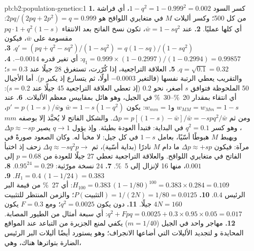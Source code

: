 \begin{solution}{pb:b2:population-genetics:1}
\textbf{1.} كسر السود $1 - q^{2} = 1 - 0.999^{2} = 0.002$،
أي فراشة من كل 500؛ وكسر أليلات $M$ في متغايري اللواقح هو
$2pq/(2pq + 2p^{2}) = q = 0.999$: أي كلها عمليًا.
\textbf{2.} عند $\bar w = 1 - sq^{2}$، تكون نسخ  الفاتح
بعد الانتقاء $pq\cdot 1 + q^{2}(1 - s)$ مقسومة على $\bar w$، فيكون $q'
= (pq + q^{2} - sq^{2})/(1 - sq^{2}) = q(1 - sq)/(1 - sq^{2})$.
\textbf{3.} $q_1 = 0.999\times(1 - 0.2997)/(1 - 0.2994) = 0.99857$:
أي تغير قدره $-0.0014$.
\textbf{4.} $q = \sqrt{0.1} = 0.32$.
\textbf{5.} العلاقة التراجعية، إذا كُرّرت، تستغرق 28 جيلًا عند $s =
0.3$؛ والتقريب يعطي الرتبة نفسها (فالتغير
$-0.0003$ أولًا، ثم يتسارع إذ يكبر $p$). أما الأجيال 50
الملحوظة فتوافق $s$ أصغر، نحو $0.2$ (إذ تعطي العلاقة
التراجعية 45 جيلًا عند $s = 0.2$): أي انتقاء بمقدار \qtyrange{20}{30}{\%}
في الجيل، وهو هائل بمقاييس معظم الأليلات.
\textbf{6.} عند $w_{MM} = w_{Mm} = 1 - s$ و$w_{mm} = 1$: يكون $\bar w = 1
- s(1 - q^{2})$ و$p' = p(1 - s)/\bar w$، ومن ثم $\Delta p = p[(1 - s) -
\bar w]/\bar w = -spq^{2}/\bar w$. والشكل الفاتح لا يُحبَّذ إلا بوصفه
 $mm$، وهو كسر $q^{2} = 0.1$ في البداية: فتبدأ
العودة بطيئة. وإذ يؤول $q \to 1$ يصير $\Delta p \approx -sp$ ويهبط $M$
هبوطًا أسّيًا، بعامل $1 - s$ في كل جيل: 
 لا مخبأ له. وكان الصعود صورةً في مرآة:
فيكون $\Delta p \approx +sp$ ما دام $M$ نادرًا (بداية أسّية)، ثم
$\Delta q \approx -sq^{2}p \to$ زحف إذ اختبأ  الفاتح في
متغايري اللواقح. والعلاقة التراجعية تعطي 27 جيلًا للعودة
من $p = 0.68$ إلى $0.001$، منها 16 لإنزال  إلى \qty{5}{\%}.
\textbf{7.} $24$ نسخة مورّثية: $0.95^{24} = 0.29$.
\textbf{8.} $H_1 = 0.4\,(1 - 1/24) = 0.383$.
\textbf{9.} $H_{100} = 0.383\,(1 - 1/80)^{100} = 0.383\times 0.284 =
0.109$: أي \qty{27}{\%} من قيمة البر الرئيس $0.4$.
\textbf{10.} $P(\text{التثبيت}) = 1/(2N) = 1/80 = 0.0125$؛ والزمن
المنتظر للتثبيت $4N = 160$ جيلًا.
\textbf{11.} دون  يكون $q^{2} = 0.0025$؛ ومع $F = 0.3$ يكون
$q^{2} + Fpq = 0.0025 + 0.3\times 0.95\times 0.05 = 0.017$: أي سبعة
أمثال من الطيور المصابة.
\textbf{12.} مهاجر واحد في الجيل ($m = 1/40$) يكفي
لمنع الجزيرة من التباعد عند المواقع المحايدة و
لتجديد الأليلات التي أضاعها الانجراف؛ وهو يستورد أيضًا
أليلات البر الرئيس الضارة بتواترها هناك، وهي،

\end{solution}
